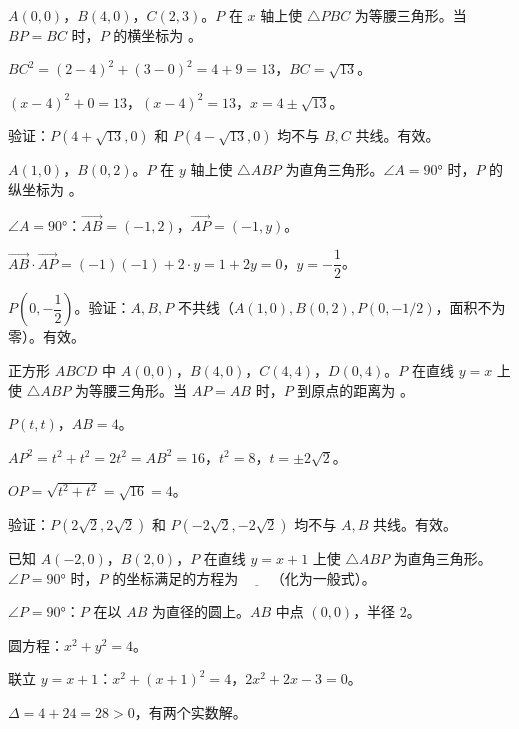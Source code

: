 \documentclass{exam-zh}
\begin{document}
\begin{question}[points=3]
  $A(0,0)$，$B(4,0)$，$C(2,3)$。$P$ 在 $x$ 轴上使 $\triangle PBC$ 为等腰三角形。当 $BP=BC$ 时，$P$ 的横坐标为 \fillin。
  \fillin
  \paren[$x=4\pm\sqrt{13}$]
  \begin{solutionblock}
    $BC^2=(2-4)^2+(3-0)^2=4+9=13$，$BC=\sqrt{13}$。

$(x-4)^2+0=13$，$(x-4)^2=13$，$x=4\pm\sqrt{13}$。

验证：$P(4+\sqrt{13},0)$ 和 $P(4-\sqrt{13},0)$ 均不与 $B,C$ 共线。有效。
  \end{solutionblock}
\end{question}



\begin{question}[points=3]
  $A(1,0)$，$B(0,2)$。$P$ 在 $y$ 轴上使 $\triangle ABP$ 为直角三角形。$\angle A=90°$ 时，$P$ 的纵坐标为 \fillin。
  \fillin
  \paren[$y=-\dfrac{1}{2}$]
  \begin{solutionblock}
    $\angle A=90°$：$\overrightarrow{AB}=(-1,2)$，$\overrightarrow{AP}=(-1,y)$。

$\overrightarrow{AB}\cdot\overrightarrow{AP}=(-1)(-1)+2\cdot y=1+2y=0$，$y=-\dfrac{1}{2}$。

$P\left(0,-\dfrac{1}{2}\right)$。验证：$A,B,P$ 不共线（$A(1,0),B(0,2),P(0,-1/2)$，面积不为零）。有效。
  \end{solutionblock}
\end{question}



\begin{question}[points=3]
  正方形 $ABCD$ 中 $A(0,0)$，$B(4,0)$，$C(4,4)$，$D(0,4)$。$P$ 在直线 $y=x$ 上使 $\triangle ABP$ 为等腰三角形。当 $AP=AB$ 时，$P$ 到原点的距离为 \fillin。
  \fillin
  \paren[$4$]
  \begin{solutionblock}
    $P(t,t)$，$AB=4$。

$AP^2=t^2+t^2=2t^2=AB^2=16$，$t^2=8$，$t=\pm 2\sqrt{2}$。

$OP=\sqrt{t^2+t^2}=\sqrt{16}=4$。

验证：$P(2\sqrt{2},2\sqrt{2})$ 和 $P(-2\sqrt{2},-2\sqrt{2})$ 均不与 $A,B$ 共线。有效。
  \end{solutionblock}
\end{question}



\begin{question}[points=3]
  已知 $A(-2,0)$，$B(2,0)$，$P$ 在直线 $y=x+1$ 上使 $\triangle ABP$ 为直角三角形。$\angle P=90°$ 时，$P$ 的坐标满足的方程为 $\underline{\quad\quad}$（化为一般式）。
  \fillin
  \paren[$2x^2+2x-3=0$]
  \begin{solutionblock}
    $\angle P=90°$：$P$ 在以 $AB$ 为直径的圆上。$AB$ 中点 $(0,0)$，半径 $2$。

圆方程：$x^2+y^2=4$。

联立 $y=x+1$：$x^2+(x+1)^2=4$，$2x^2+2x-3=0$。

$\Delta=4+24=28>0$，有两个实数解。
  \end{solutionblock}
\end{question}
\end{document}
